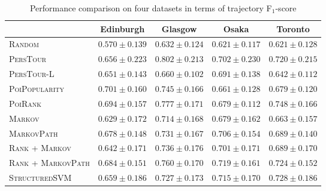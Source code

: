\begin{table*}
\centering
\begin{tabular}{l|cccc} \hline
 & Edinburgh & Glasgow & Osaka & Toronto \\ \hline
\textsc{Random} & $0.570\pm0.139$ & $0.632\pm0.124$ & $0.621\pm0.117$ & $0.621\pm0.128$ \\
\textsc{PersTour}\cite{ijcai15} & $0.656\pm0.223$ & $\mathbf{0.802\pm0.213}$ & $0.702\pm0.230$ & $0.720\pm0.215$ \\
\textsc{PersTour-L} & $0.651\pm0.143$ & $0.660\pm0.102$ & $0.691\pm0.138$ & $0.642\pm0.112$ \\
\textsc{PoiPopularity} & $\mathbf{0.701\pm0.160}$ & $0.745\pm0.166$ & $0.661\pm0.128$ & $0.679\pm0.120$ \\
\textsc{PoiRank} & $\mathit{0.694\pm0.157}$ & $\mathit{0.777\pm0.171}$ & $0.679\pm0.112$ & $\mathbf{0.748\pm0.166}$ \\
\textsc{Markov} & $0.629\pm0.172$ & $0.714\pm0.168$ & $0.679\pm0.162$ & $0.663\pm0.157$ \\
\textsc{MarkovPath} & $0.678\pm0.148$ & $0.731\pm0.167$ & $0.706\pm0.154$ & $0.689\pm0.140$ \\
\textsc{Rank} + \textsc{Markov} & $0.642\pm0.171$ & $0.736\pm0.176$ & $0.701\pm0.171$ & $0.689\pm0.170$ \\
\textsc{Rank} + \textsc{MarkovPath} & $0.684\pm0.151$ & $0.760\pm0.170$ & $\mathbf{0.719\pm0.161}$ & $0.724\pm0.152$ \\
\textsc{StructuredSVM} & $0.659\pm0.186$ & $0.727\pm0.173$ & $\mathit{0.715\pm0.170}$ & $\mathit{0.728\pm0.186}$ \\
\hline
\end{tabular}
\caption{Performance comparison on four datasets in terms of trajectory F$_1$-score}
\label{table:f1}
\end{table*}



